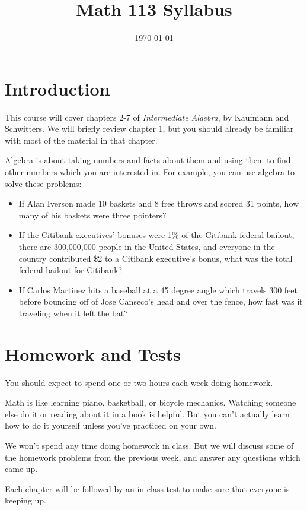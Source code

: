 \documentclass{article}
\title{Math 113 Syllabus}
\date{\today}
\begin{document}
\maketitle

\section{Introduction}
This course will cover chapters 2-7 of {\em Intermediate Algebra}, by Kaufmann and Schwitters.  We will briefly review
chapter 1, but you should already be familiar with most of the material in that chapter.

Algebra is about taking numbers and facts about them and using them to find other numbers which you are interested
in.  For example, you can use algebra to solve these problems:

\begin{itemize}
\item If Alan Iverson made 10 baskets and 8 free throws and scored 31 points, how many of his baskets were three pointers?
\item If the Citibank executives' bonuses were 1\% of the Citibank federal bailout, there are 300,000,000 people in the
  United States, and everyone in the country contributed \$2 to a Citibank executive's bonus, what was the total federal
  bailout for Citibank?
\item If Carlos Martinez hits a baseball at a 45 degree angle which travels 300 feet before bouncing off of Jose
  Canseco's head and over the fence, how fast was it traveling when it left the bat?
\end{itemize}

\section{Homework and Tests}

You should expect to spend one or two hours each week doing homework.

Math is like learning piano, basketball, or bicycle mechanics.  Watching someone else do it or reading about it in a
book is helpful.  But you can't actually learn how to do it yourself unless you've practiced on your own.

We won't spend any time doing homework in class.  But we will discuss some of the homework problems from the
previous week, and answer any questions which came up.

Each chapter will be followed by an in-class test to make sure that everyone is keeping up.
\end{document}
